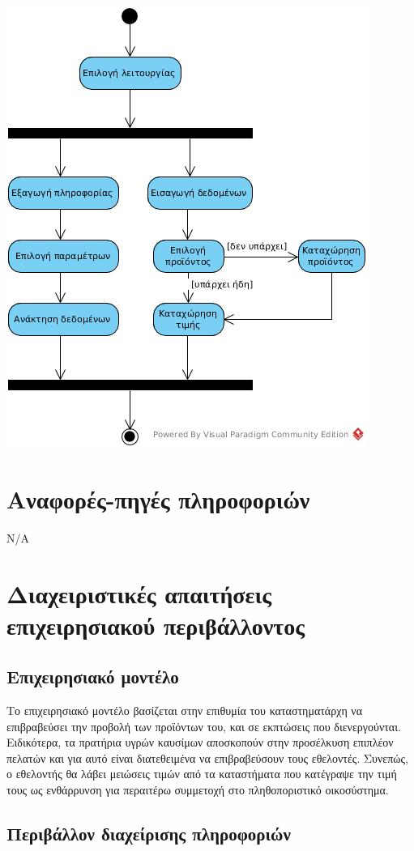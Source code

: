 \documentclass[a4paper,oneside, 12pt]{article}
\begin{document}
\includegraphics[scale=0.6]{UML-01}

\section{Αναφορές-πηγές πληροφοριών}

Ν/Α

\section{Διαχειριστικές απαιτήσεις επιχειρησιακού περιβάλλοντος}
\subsection{Επιχειρησιακό μοντέλο}
Το επιχειρησιακό μοντέλο βασίζεται στην επιθυμία του καταστηματάρχη να 
επιβραβεύσει την προβολή των προϊόντων του, και σε εκπτώσεις που διενεργούνται. 
Ειδικότερα, τα πρατήρια υγρών καυσίμων αποσκοπούν στην προσέλκυση επιπλέον πελατών 
και για αυτό είναι διατεθειμένα να επιβραβεύσουν τους εθελοντές. Συνεπώς, ο 
εθελοντής θα λάβει μειώσεις τιμών από τα καταστήματα που κατέγραψε την τιμή τους 
ως ενθάρρυνση για περαιτέρω συμμετοχή στο πληθοποριστικό οικοσύστημα. 

\subsection{Περιβάλλον διαχείρισης πληροφοριών}
\end{document}
